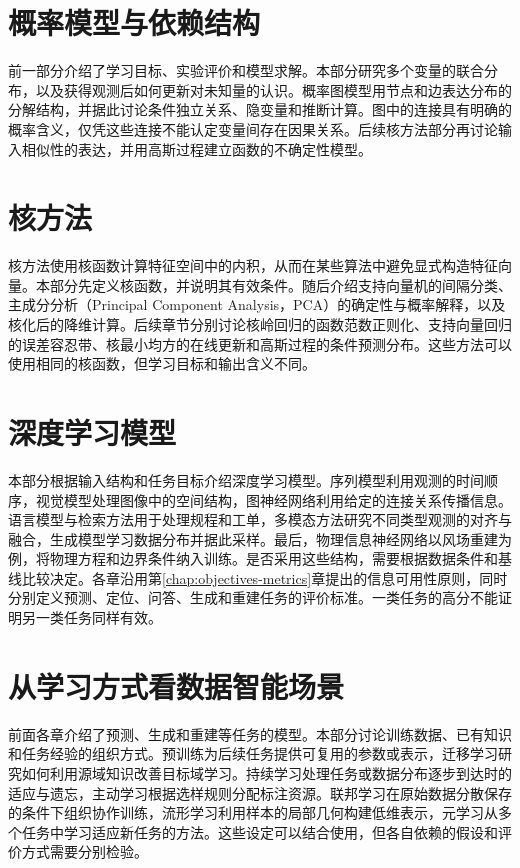 \documentclass[UTF8,11pt,zihao=false,linespread=1.3,openany]{ctexbook}
\begin{document}
\part{概率模型与依赖结构}
前一部分介绍了学习目标、实验评价和模型求解。本部分研究多个变量的联合分布，以及获得观测后如何更新对未知量的认识。概率图模型用节点和边表达分布的分解结构，并据此讨论条件独立关系、隐变量和推断计算。图中的连接具有明确的概率含义，仅凭这些连接不能认定变量间存在因果关系。后续核方法部分再讨论输入相似性的表达，并用高斯过程建立函数的不确定性模型。


\part{核方法}
核方法使用核函数计算特征空间中的内积，从而在某些算法中避免显式构造特征向量。本部分先定义核函数，并说明其有效条件。随后介绍支持向量机的间隔分类、主成分分析（Principal Component Analysis，PCA）的确定性与概率解释，以及核化后的降维计算。后续章节分别讨论核岭回归的函数范数正则化、支持向量回归的误差容忍带、核最小均方的在线更新和高斯过程的条件预测分布。这些方法可以使用相同的核函数，但学习目标和输出含义不同。








\part{深度学习模型}
本部分根据输入结构和任务目标介绍深度学习模型。序列模型利用观测的时间顺序，视觉模型处理图像中的空间结构，图神经网络利用给定的连接关系传播信息。语言模型与检索方法用于处理规程和工单，多模态方法研究不同类型观测的对齐与融合，生成模型学习数据分布并据此采样。最后，物理信息神经网络以风场重建为例，将物理方程和边界条件纳入训练。是否采用这些结构，需要根据数据条件和基线比较决定。各章沿用第\ref{chap:objectives-metrics}章提出的信息可用性原则，同时分别定义预测、定位、问答、生成和重建任务的评价标准。一类任务的高分不能证明另一类任务同样有效。








\part{从学习方式看数据智能场景}
前面各章介绍了预测、生成和重建等任务的模型。本部分讨论训练数据、已有知识和任务经验的组织方式。预训练为后续任务提供可复用的参数或表示，迁移学习研究如何利用源域知识改善目标域学习。持续学习处理任务或数据分布逐步到达时的适应与遗忘，主动学习根据选样规则分配标注资源。联邦学习在原始数据分散保存的条件下组织协作训练，流形学习利用样本的局部几何构建低维表示，元学习从多个任务中学习适应新任务的方法。这些设定可以结合使用，但各自依赖的假设和评价方式需要分别检验。







\end{document}
